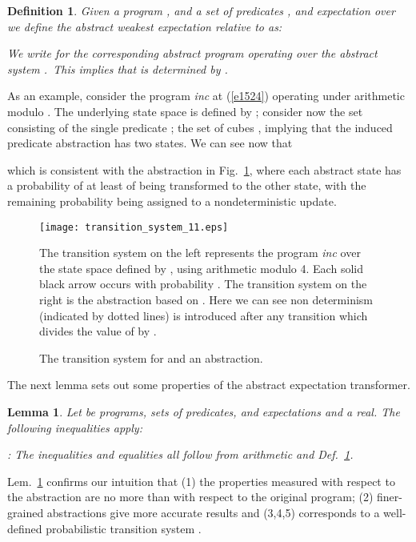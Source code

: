 \documentclass[numbers,copyright,creativecommons]{eptcs}
\newcommand{\Eqn}[1]{(\ref{#1})}
\newcommand{\figg}[1]{Fig.~\ref{#1}}
\newtheorem{Lems}{Lemma} \newcommand{\Lem}[1]{Lem.~\ref{#1}}
\newtheorem{Defns}{Definition}\newtheorem{Corl}{Corollary}\newcommand{\Def}[1]{Def.~\ref{#1}}
\newcommand{\Proof}{\noindent{\bf Proof}: \quad}
\begin{document}
\begin{Defns}\label{d1822}
Given a  program , and a set of predicates , and expectation  over  we define the abstract weakest expectation relative to  as:

We write  for the corresponding abstract program operating over the abstract system .\ This implies that
 is determined by .
\end{Defns}

As an example, consider the program  \textit{inc} at \Eqn{e1524} operating under arithmetic modulo . The underlying state space is defined by ; consider now the set   consisting of the single predicate ; the set of cubes , implying that the induced predicate abstraction has two states. We can see now that

which is consistent with the abstraction in \figg{f1414}, where each abstract state has a probability of at least  of
being transformed to the other state, with the remaining probability being assigned to a nondeterministic update.
\begin{figure}
\begin{center}
\texttt{[image: transition\_system\_11.eps]}
\end{center}

\small{The transition system on the left represents the program \textit{inc} over the state space defined by , using arithmetic modulo 4. Each solid black arrow occurs with probability . The transition system on the right is the abstraction based on . Here we can see non determinism (indicated by dotted lines) is introduced after any transition which divides the value of  by .}
\caption{The transition system for  and an abstraction.}\label{f1414}
\end{figure}

The next lemma sets out some properties of the abstract expectation transformer.

\begin{Lems}\label{l1541}
Let  be  programs,   sets of predicates, and  expectations and  a real. The following inequalities apply:


\Proof
The inequalities and equalities all follow from arithmetic and \Def{d1822}.
\end{Lems}

\Lem{l1541} confirms our intuition that (1) the properties measured with respect to the abstraction are no more than with respect to the original program; (2) finer-grained abstractions give more accurate results and (3,4,5)  corresponds to a well-defined probabilistic transition system \cite{ARP}.
\end{document}
